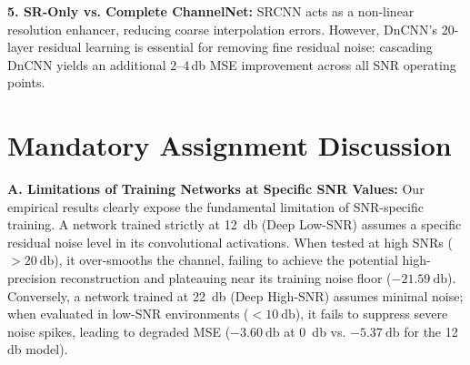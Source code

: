 \documentclass[10pt,a4paper]{article}
\begin{document}
\textbf{5. SR-Only vs. Complete ChannelNet:} SRCNN acts as a non-linear resolution enhancer, reducing coarse interpolation errors. However, DnCNN's 20-layer residual learning is essential for removing fine residual noise: cascading DnCNN yields an additional 2--4\,\si{\decibel} MSE improvement across all SNR operating points.

\section{Mandatory Assignment Discussion}
\label{sec:mandatory_discussion}
\textbf{A. Limitations of Training Networks at Specific SNR Values:}
Our empirical results clearly expose the fundamental limitation of SNR-specific training. A network trained strictly at \SI{12}{\decibel} (Deep Low-SNR) assumes a specific residual noise level in its convolutional activations. When tested at high SNRs ($> \SI{20}{\decibel}$), it over-smooths the channel, failing to achieve the potential high-precision reconstruction and plateauing near its training noise floor ($-\SI{21.59}{\decibel}$). Conversely, a network trained at \SI{22}{\decibel} (Deep High-SNR) assumes minimal noise; when evaluated in low-SNR environments ($< \SI{10}{\decibel}$), it fails to suppress severe noise spikes, leading to degraded MSE ($-\SI{3.60}{\decibel}$ at \SI{0}{\decibel} vs. $-\SI{5.37}{\decibel}$ for the 12\,\si{\decibel} model).
\end{document}

